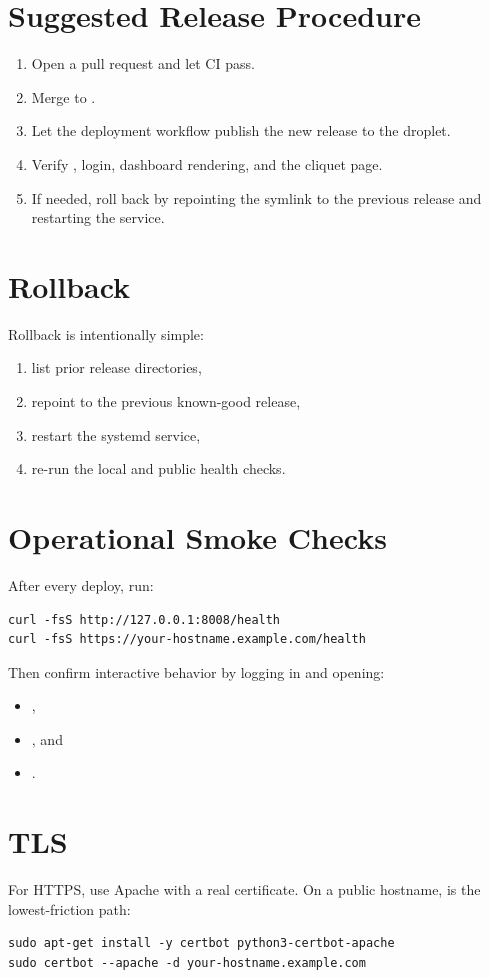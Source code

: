 \documentclass[conference]{IEEEtran}
\begin{document}
\section{Suggested Release Procedure}
\begin{enumerate}[leftmargin=1.5em]
    \item Open a pull request and let CI pass.
    \item Merge to .
    \item Let the deployment workflow publish the new release to the droplet.
    \item Verify , login, dashboard rendering, and the cliquet page.
    \item If needed, roll back by repointing the  symlink to the previous release and restarting the service.
\end{enumerate}

\section{Rollback}
Rollback is intentionally simple:
\begin{enumerate}[leftmargin=1.5em]
    \item list prior release directories,
    \item repoint  to the previous known-good release,
    \item restart the systemd service,
    \item re-run the local and public health checks.
\end{enumerate}

\section{Operational Smoke Checks}
After every deploy, run:
\begin{lstlisting}
curl -fsS http://127.0.0.1:8008/health
curl -fsS https://your-hostname.example.com/health
\end{lstlisting}
Then confirm interactive behavior by logging in and opening:
\begin{itemize}[leftmargin=1.5em]
    \item {},
    \item {}, and
    \item {}.
\end{itemize}

\section{TLS}
For HTTPS, use Apache with a real certificate. On a public hostname,  is the lowest-friction path:
\begin{lstlisting}
sudo apt-get install -y certbot python3-certbot-apache
sudo certbot --apache -d your-hostname.example.com
\end{lstlisting}
\end{document}
